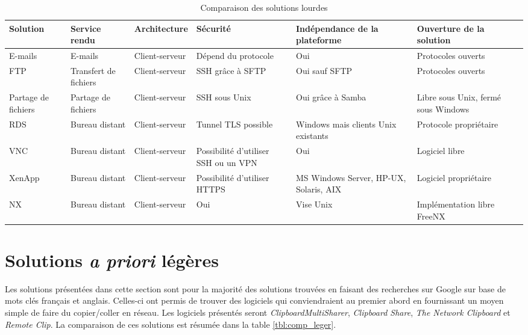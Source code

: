 \begin{sidewaystable}[!h]
  \centering
  \begin{tabular}{|l|l|l|m{7em}|m{7em}|m{7em}|}
    \hline
    Solution & Service rendu & Architecture & Sécurité & In\-dé\-pen\-dance
    de la plateforme & Ouverture de la solution \\
    \hline
    \hline
    E-mails & E-mails & Client-serveur & Dépend du protocole & Oui &
    Protocoles ouverts \\
    \hline
    FTP & Transfert de fichiers & Client-serveur & SSH grâce à SFTP & Oui
    sauf SFTP & Protocoles ouverts \\
    \hline
    Partage de fichiers & Partage de fichiers & Client-serveur & SSH sous
    Unix & Oui grâce à Samba & Libre sous Unix, fermé sous Windows \\
    \hline
    RDS & Bureau distant & Client-serveur & Tunnel TLS possible & Windows
    mais clients Unix existants & Protocole propriétaire\\
    \hline
    VNC & Bureau distant & Client-serveur & Possibilité d'utiliser SSH ou un
    VPN & Oui & Logiciel libre \\
    \hline
    XenApp & Bureau distant & Client-serveur & Possibilité d'utiliser HTTPS &
    MS Windows Server, HP-UX, Solaris, AIX & Logiciel propriétaire \\
    \hline
    NX & Bureau distant & Client-serveur & Oui & Vise Unix &
    Im\-plé\-men\-ta\-tion libre FreeNX \\
    \hline
  \end{tabular}
  \caption{\label{tbl:comp_lourd} Comparaison des solutions lourdes}
\end{sidewaystable}

\section{Solutions \emph{a priori} légères}
Les solutions présentées dans cette section sont pour la majorité des
solutions trouvées en faisant des recherches sur Google sur base
de mots clés français et anglais. Celles-ci ont permis de trouver des
logiciels qui conviendraient au premier abord en fournissant un moyen
simple de faire du copier/coller en réseau. Les logiciels présentés seront
\emph{ClipboardMultiSharer}, \emph{Clipboard Share},
\emph{The Network Clipboard} et \emph{Remote Clip}.
La comparaison de ces solutions est résumée dans la table \ref{tbl:comp_leger}.

